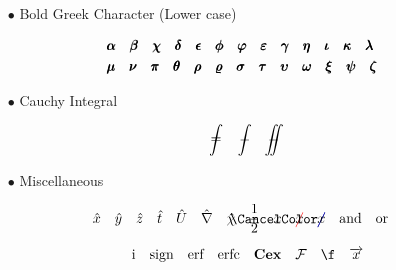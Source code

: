 \begin{itemize}
\item[$\bullet$] Bold Greek Character (Lower case)

\begin{equation*}
	\begin{aligned}
		&\pmb{\alpha} \quad	
		\pmb{\beta} \quad
		\pmb{\chi} \quad
		\pmb{\delta} \quad
		\pmb{\epsilon} \quad
		\pmb{\phi} \quad
		\pmb{\varphi} \quad
		\pmb{\varepsilon} \quad
		\pmb{\gamma} \quad
		\pmb{\eta} \quad
		\pmb{\iota} \quad
		\pmb{\kappa} \quad
		\pmb{\lambda} \quad
		\\&
		\pmb{\mu} \quad
		\pmb{\nu} \quad		
		\pmb{\pi} \quad
		\pmb{\theta} \quad
		\pmb{\rho} \quad
		\pmb{\varrho} \quad
		\pmb{\sigma} \quad
		\pmb{\tau} \quad
		\pmb{\upsilon} \quad
		\pmb{\omega} \quad
		\pmb{\xi} \quad
		\pmb{\psi} \quad
		\pmb{\zeta}
	\end{aligned}
\end{equation*}

\item[$\bullet$] Cauchy Integral

\begin{equation*}\label{key}
	\ddashint \quad
	\dashint \quad
	\dashiint	
\end{equation*}

\item[$\bullet$] Miscellaneous

\begin{equation*}\label{key}
	\hatx \quad 
	\haty \quad 
	\hatz \quad
	\hatt \quad
	\hatU \quad
	\hatnabla \quad
	\hatchi \quad
	\half \quad 
	\cancel{x} \quad
	\cancelRed{x} \quad
	\cancelBlue{x} \quad
	\textand \quad
	\textor \quad
\end{equation*}

\begin{equation*}
	\imn \quad 
	\sign \quad
	\erf \quad
	\erfc \quad
	\Cex \quad
	\Fr \quad
	\f \quad
	\vect{x} 
\end{equation*}




\end{itemize}